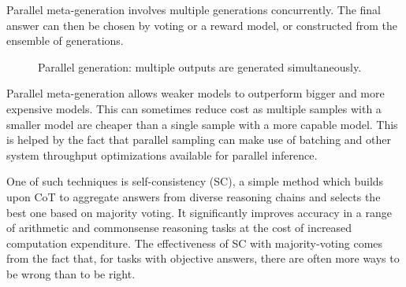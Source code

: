 Parallel meta-generation involves multiple generations concurrently. 
The final answer can then be chosen by voting or a reward model, or constructed from the ensemble of generations\cite{welleck2024decodingmetagenerationinferencetimealgorithms}.

\begin{figure}[ht]
    \centering
    \caption{Parallel generation: multiple outputs are generated simultaneously.}
    \label{fig:parallel_generation}
\end{figure}

Parallel meta-generation allows weaker models to outperform bigger and more expensive models\cite{brown2024largelanguagemonkeysscaling}.
This can sometimes reduce cost as multiple samples with a smaller model are cheaper than a single sample with a more capable model.
This is helped by the fact that parallel sampling can make use of batching and other system throughput optimizations
available for parallel inference\cite{brown2024largelanguagemonkeysscaling}.

One of such techniques is self-consistency\cite{wang2023selfconsistencyimproveschainthought} (SC),
a simple method which builds upon CoT to aggregate answers from diverse reasoning 
chains and selects the best one based on majority voting. 
It significantly improves accuracy in a range of arithmetic and commonsense reasoning tasks 
at the cost of increased computation expenditure\cite{wang2023selfconsistencyimproveschainthought}.
The effectiveness of SC with majority-voting comes from the fact that, for tasks with objective answers, there are often more ways to be wrong than to be right.

